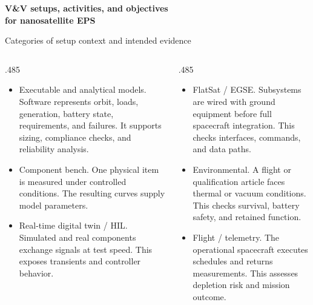 \documentclass[aspectratio=169,10pt]{beamer}
\newcommand{\term}[1]{{\color{Ink}#1}}
\newenvironment{tightitems}{%
  \begin{itemize}\setlength{\itemsep}{.52em}\setlength{\topsep}{.15em}\setlength{\parskip}{0pt}%
}{\end{itemize}}
\begin{document}
\begin{frame}[plain]
  \vspace*{17mm}
  {\raggedright\fontsize{28}{31}\selectfont\bfseries
    V\&V setups, activities, and objectives\\[-1mm]
    for nanosatellite EPS\par}
  \vfill
\end{frame}

\begin{frame}{Categories of setup context and intended evidence}
  \begin{columns}[T,onlytextwidth]
    \begin{column}{.485\textwidth}
      \begin{tightitems}
        \item \term{Executable and analytical models}. Software represents orbit, loads, generation, battery state, requirements, and failures. It supports sizing, compliance checks, and reliability analysis.
        \item \term{Component bench}. One physical item is measured under controlled conditions. The resulting curves supply model parameters.
        \item \term{Real-time digital twin / HIL}. Simulated and real components exchange signals at test speed. This exposes transients and controller behavior.
      \end{tightitems}
    \end{column}
    \begin{column}{.485\textwidth}
      \begin{tightitems}
        \item \term{FlatSat / EGSE}. Subsystems are wired with ground equipment before full spacecraft integration. This checks interfaces, commands, and data paths.
        \item \term{Environmental}. A flight or qualification article faces thermal or vacuum conditions. This checks survival, battery safety, and retained function.
        \item \term{Flight / telemetry}. The operational spacecraft executes schedules and returns measurements. This assesses depletion risk and mission outcome.
      \end{tightitems}
    \end{column}
  \end{columns}
\end{frame}
\end{document}
